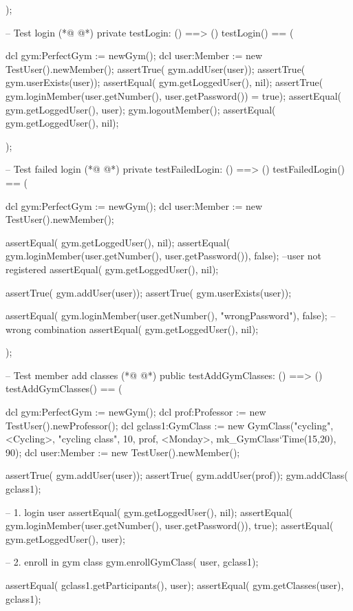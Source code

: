 \begin{vdmpp}[breaklines=true]
 );
 
  -- Test login
(*@
\label{testLogin:228}
@*)
  private testLogin: () ==> ()
 testLogin() == (
  
   dcl gym:PerfectGym := newGym();
   dcl user:Member := new TestUser().newMember(); 
   assertTrue( gym.addUser(user));
   assertTrue( gym.userExists(user));
   assertEqual( gym.getLoggedUser(), nil); 
   assertTrue( gym.loginMember(user.getNumber(), user.getPassword()) = true);
   assertEqual( gym.getLoggedUser(), user); 
    gym.logoutMember();
    assertEqual( gym.getLoggedUser(), nil); 
   
 );
 
 -- Test failed login
(*@
\label{testFailedLogin:244}
@*)
  private testFailedLogin: () ==> ()
 testFailedLogin() == (
    
    dcl gym:PerfectGym := newGym(); 
   dcl user:Member := new TestUser().newMember(); 
   
   assertEqual( gym.getLoggedUser(), nil); 
   assertEqual( gym.loginMember(user.getNumber(), user.getPassword()), false); --user not registered
   assertEqual( gym.getLoggedUser(), nil); 
   
   assertTrue( gym.addUser(user));
   assertTrue( gym.userExists(user));

   assertEqual( gym.loginMember(user.getNumber(), "wrongPassword"), false);   --wrong combination
   assertEqual( gym.getLoggedUser(), nil); 
  
 );
 
 -- Test member add classes
(*@
\label{testAddGymClasses:263}
@*)
 public testAddGymClasses: () ==> ()
 testAddGymClasses() == (
 
   dcl gym:PerfectGym := newGym();
  dcl prof:Professor := new TestUser().newProfessor();
  dcl gclass1:GymClass := new GymClass("cycling", <Cycling>, "cycling class", 10, prof, <Monday>, mk_GymClass`Time(15,20), 90);
  dcl user:Member := new TestUser().newMember(); 
  
  assertTrue( gym.addUser(user));
  assertTrue( gym.addUser(prof));
  gym.addClass( gclass1); 
  
  
  -- 1. login user
  assertEqual( gym.getLoggedUser(), nil); 
  assertEqual( gym.loginMember(user.getNumber(), user.getPassword()), true);
  assertEqual( gym.getLoggedUser(), user);
  
  -- 2. enroll in gym class
  gym.enrollGymClass( user, gclass1);
  
  assertEqual( gclass1.getParticipants(), {user});
  assertEqual( gym.getClasses(user), {gclass1});
 

\end{vdmpp}

